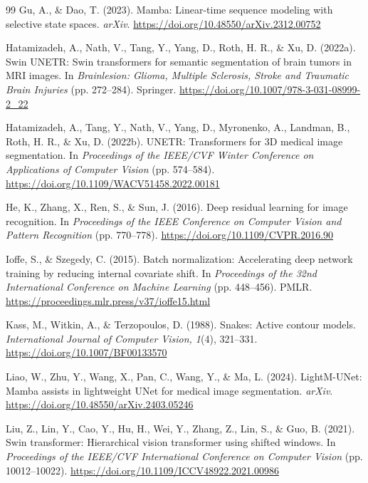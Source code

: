 \begin{thebibliography}{99}
Gu, A., \& Dao, T. (2023). Mamba: Linear-time sequence modeling with selective state spaces. \textit{arXiv}. \url{https://doi.org/10.48550/arXiv.2312.00752}

Hatamizadeh, A., Nath, V., Tang, Y., Yang, D., Roth, H. R., \& Xu, D. (2022a). Swin UNETR: Swin transformers for semantic segmentation of brain tumors in MRI images. In \textit{Brainlesion: Glioma, Multiple Sclerosis, Stroke and Traumatic Brain Injuries} (pp. 272--284). Springer. \url{https://doi.org/10.1007/978-3-031-08999-2_22}

Hatamizadeh, A., Tang, Y., Nath, V., Yang, D., Myronenko, A., Landman, B., Roth, H. R., \& Xu, D. (2022b). UNETR: Transformers for 3D medical image segmentation. In \textit{Proceedings of the IEEE/CVF Winter Conference on Applications of Computer Vision} (pp. 574--584). \url{https://doi.org/10.1109/WACV51458.2022.00181}

He, K., Zhang, X., Ren, S., \& Sun, J. (2016). Deep residual learning for image recognition. In \textit{Proceedings of the IEEE Conference on Computer Vision and Pattern Recognition} (pp. 770--778). \url{https://doi.org/10.1109/CVPR.2016.90}

Ioffe, S., \& Szegedy, C. (2015). Batch normalization: Accelerating deep network training by reducing internal covariate shift. In \textit{Proceedings of the 32nd International Conference on Machine Learning} (pp. 448--456). PMLR. \url{https://proceedings.mlr.press/v37/ioffe15.html}

Kass, M., Witkin, A., \& Terzopoulos, D. (1988). Snakes: Active contour models. \textit{International Journal of Computer Vision, 1}(4), 321--331. \url{https://doi.org/10.1007/BF00133570}

Liao, W., Zhu, Y., Wang, X., Pan, C., Wang, Y., \& Ma, L. (2024). LightM-UNet: Mamba assists in lightweight UNet for medical image segmentation. \textit{arXiv}. \url{https://doi.org/10.48550/arXiv.2403.05246}

Liu, Z., Lin, Y., Cao, Y., Hu, H., Wei, Y., Zhang, Z., Lin, S., \& Guo, B. (2021). Swin transformer: Hierarchical vision transformer using shifted windows. In \textit{Proceedings of the IEEE/CVF International Conference on Computer Vision} (pp. 10012--10022). \url{https://doi.org/10.1109/ICCV48922.2021.00986}


\end{thebibliography}
